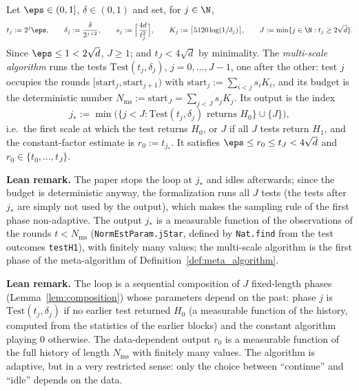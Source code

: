 \begin{definition}\label{def:multiscale_algorithm}
\leanok
{}
Let $\eps \in (0,1]$, $\delta \in (0,1)$ and set, for $j \in \N$,
\[
  t_j := 2^j\eps, \qquad \delta_j := \frac{\delta}{2^{j+2}}, \qquad
  s_j := \Big\lceil \frac{4d}{t_j^2} \Big\rceil, \qquad
  K_j := \big\lceil 5120\log(1/\delta_j) \big\rceil, \qquad
  J := \min\{ j \in \N : t_j \ge 2\sqrt d \} .
\]
Since $\eps \le 1 < 2\sqrt d$, $J \ge 1$; and $t_J < 4\sqrt d$ by minimality. The
\emph{multi-scale algorithm} runs the tests $\mathrm{Test}(t_j, \delta_j)$, $j = 0, \dots, J-1$,
one after the other: test $j$ occupies the rounds $[\mathrm{start}_j, \mathrm{start}_{j+1})$
with $\mathrm{start}_j := \sum_{i<j} s_iK_i$, and its budget is the deterministic number
$N_{\mathrm{ms}} := \mathrm{start}_J = \sum_{j<J} s_jK_j$. Its output is the index
\[
  j_* := \min\big( \{ j < J : \mathrm{Test}(t_j,\delta_j) \text{ returns } H_0 \} \cup \{J\} \big),
\]
i.e.\ the first scale at which the test returns $H_0$, or $J$ if all $J$ tests return $H_1$,
and the constant-factor estimate is $r_0 := t_{j_*}$. It satisfies
$\eps \le r_0 \le t_J < 4\sqrt d$ and $r_0 \in \{t_0, \dots, t_J\}$.
\end{definition}

\textbf{Lean remark.} The paper stops the loop at $j_*$ and idles afterwards; since the
budget is deterministic anyway, the formalization runs all $J$ tests (the tests after $j_*$
are simply not used by the output), which makes the sampling rule of the first phase
non-adaptive. The output $j_*$ is a measurable function of the observations of the rounds
$t < N_{\mathrm{ms}}$ (\texttt{NormEstParam.jStar}, defined by \texttt{Nat.find} from the
test outcomes \texttt{testH1}), with finitely many values; the multi-scale algorithm is the
first phase of the meta-algorithm of Definition~\ref{def:meta_algorithm}.

\textbf{Lean remark.} The loop is a sequential composition of $J$ fixed-length phases
(Lemma~\ref{lem:composition}) whose parameters depend on the past: phase $j$ is
$\mathrm{Test}(t_j,\delta_j)$ if no earlier test returned $H_0$ (a measurable function of the
history, computed from the statistics of the earlier blocks) and the constant algorithm
playing $0$ otherwise. The data-dependent output $r_0$ is a measurable function of the full
history of length $N_{\mathrm{ms}}$ with finitely many values. The algorithm is adaptive, but
in a very restricted sense: only the choice between ``continue'' and ``idle'' depends on the
data.

